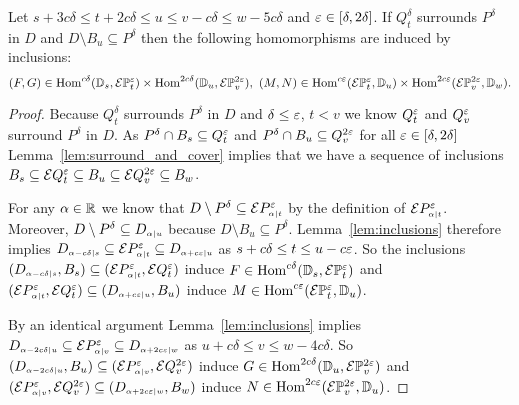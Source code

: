 \begin{lemma}\label{lem:inclusion_hom}
  Let $s + 3c\delta\leq t + 2c\delta\leq u\leq v-c\delta\leq w-5c\delta$ and $\e\in [\delta,2\delta]$.
  If $Q_{t}^\delta$ surrounds $P^\delta$ in $D$ and $D\setminus B_u\subseteq P^\delta$ then the following homomorphisms are induced by inclusions:
  \[(F, G)\in \Hom^{c\delta}(\DD{s}, \E\PP{t}{\e})\times \Hom^{2c\delta}(\DD{u}, \E\PP{v}{2\e}),\ (M, N)\in \Hom^{c\e}(\E\PP{t}{\e},\DD{u})\times\Hom^{2c\e}(\E\PP{v}{2\e}, \DD{w}).\]
\end{lemma}
\begin{proof}
  Because $Q_t^\delta$ surrounds $P^\delta$ in $D$ and $\delta\leq\e$, $t < v$ we know $Q_t^\e$ and $Q_v^\e$ surround $P^\delta$ in $D$.
  As $P^\delta\cap B_s\subseteq Q_t^\e$ and $P^\delta\cap B_u\subseteq Q_v^{2\e}$ for all $\e\in[\delta,2\delta]$ Lemma~\ref{lem:surround_and_cover} implies that we have a sequence of inclusions $B_s\subseteq \E Q_t^\e\subseteq B_u\subseteq \E Q_v^{2\e}\subseteq B_w$.

  For any $\alpha\in\R$ we know that $D\setminus P^\delta \subseteq \ext{P\subi{t}{\alpha}^\e}$ by the definition of $\ext{P\subi{t}{\alpha}^\e}$.
  Moreover, $D\setminus P^\delta\subseteq D\subi{u}{\alpha}$ because $D\setminus B_u\subseteq P^\delta$.
  Lemma~\ref{lem:inclusions} therefore implies $D\subi{s}{\alpha-c\delta}\subseteq \E P\subi{t}{\alpha}^\e\subseteq D\subi{u}{\alpha+c\e}$ as $s + c\delta\leq t \leq u - c\e$.
  So the inclusions $(D\subi{s}{\alpha-c\delta}, B_s)\subseteq (\E P\subi{t}{\alpha}^\e, \E Q_t^\e)$ induce $F\in\Hom^{c\delta}(\DD{s},\E\PP{t}{\e})$ and $(\E P\subi{t}{\alpha}^\e, \E Q_t^\e)\subseteq (D\subi{u}{\alpha+c\e}, B_u)$ induce $M\in \Hom^{c\e}(\E\PP{t}{\e}, \DD{u})$.

  By an identical argument Lemma~\ref{lem:inclusions} implies $D\subi{u}{\alpha-2c\delta}\subseteq \E P\subi{v}{\alpha}^\e\subseteq D\subi{w}{\alpha+2c\e}$ as $u+c\delta\leq v\leq w-4c\delta$.
  So $(D\subi{u}{\alpha-2c\delta},B_u)\subseteq (\E P\subi{v}{\alpha}^\e, \E Q_v^{2\e})$ induce $G\in\Hom^{2c\delta}(\DD{u},\E\PP{v}{2\e})$ and $(\E P\subi{v}{\alpha}^\e, \E Q_v^{2\e})\subseteq (D\subi{w}{\alpha+2c\e},B_w)$ induce $N\in\Hom^{2c\e}(\E\PP{v}{2\e},\DD{u})$.
\end{proof}

